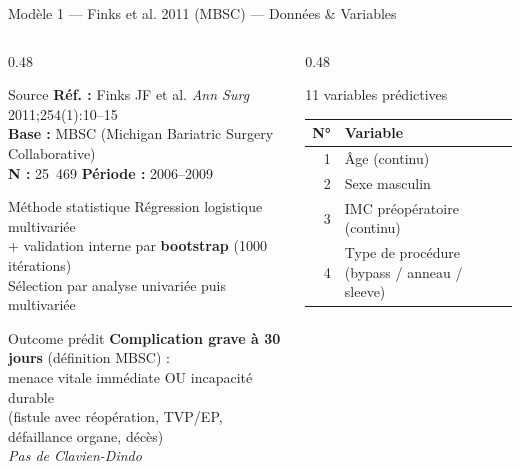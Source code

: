 \documentclass[aspectratio=169]{beamer}
\begin{document}
\begin{frame}[shrink=5]{Modèle 1 --- Finks et al. 2011 (MBSC) --- Données \& Variables}
  \begin{columns}[T]
    \begin{column}{0.48\textwidth}
      \begin{block}{Source}
        \footnotesize
        \textbf{Réf. :} Finks JF et al. \textit{Ann Surg} 2011;254(1):10--15\\
        \textbf{Base :} MBSC (Michigan Bariatric Surgery Collaborative)\\
        \textbf{N :} 25~469 \quad \textbf{Période :} 2006--2009
      \end{block}
      \vspace{0.15em}
      \begin{block}{Méthode statistique}
        \footnotesize
        Régression logistique multivariée\\
        + validation interne par \textbf{bootstrap} (1000 itérations)\\
        Sélection par analyse univariée puis multivariée
      \end{block}
      \vspace{0.15em}
      \begin{block}{Outcome prédit}
        \footnotesize
        \textbf{Complication grave à 30 jours} (définition MBSC) :\\
        menace vitale immédiate OU incapacité durable\\
        (fistule avec réopération, TVP/EP, défaillance organe, décès)\\
        \textcolor{rougealerte}{\textit{Pas de Clavien-Dindo}}
      \end{block}
    \end{column}
    \begin{column}{0.48\textwidth}
      \begin{block}{11 variables prédictives}
        \footnotesize
        \begin{tabular}{rl}
          \toprule
          \textbf{N°} & \textbf{Variable} \\
          \midrule
          1 & Âge (continu) \\
          2 & Sexe masculin \\
          3 & IMC préopératoire (continu) \\
          4 & Type de procédure (bypass / anneau / sleeve) \\

\end{tabular}
\end{block}
\end{column}
\end{columns}
\end{frame}
\end{document}
